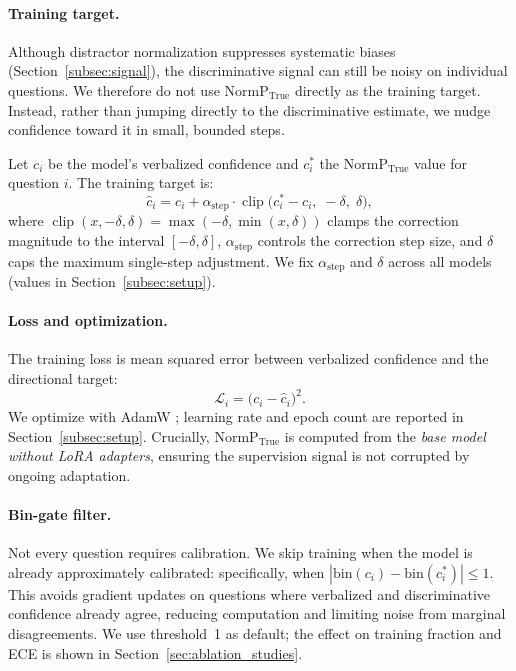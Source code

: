 \documentclass[11pt]{article}
\begin{document}
\paragraph{Training target.}
Although distractor normalization suppresses systematic biases (Section~\ref{subsec:signal}), the discriminative signal can still be noisy on individual questions. We therefore do not use $\text{NormP}_{\text{True}}$ directly as the training target. Instead, rather than jumping directly to the discriminative estimate, we nudge confidence toward it in small, bounded steps.

Let $c_i$ be the model's verbalized confidence and $c_i^*$ the $\text{NormP}_{\text{True}}$ value for question $i$.
The training target is:
\begin{equation} \label{eq:target}
    \hat{c}_i = c_i + \alpha_{\text{step}} \cdot \operatorname{clip}\!\big(c_i^* - c_i, \; {-}\delta, \; \delta\big),
\end{equation}
%
where $\operatorname{clip}(x, -\delta, \delta) = \max(-\delta, \min(x, \delta))$ clamps the correction magnitude to the interval $[-\delta, \delta]$, $\alpha_{\text{step}}$ controls the correction step size, and $\delta$ caps the maximum single-step adjustment.
We fix $\alpha_{\text{step}}$ and $\delta$ across all models (values in Section~\ref{subsec:setup}).

\paragraph{Loss and optimization.}
The training loss is mean squared error between verbalized confidence and the directional target:
\begin{equation} \label{eq:loss}
    \mathcal{L}_i = \big(c_i - \hat{c}_i\big)^2.
\end{equation}
We optimize with AdamW \cite{loshchilov_decoupled_2019}; learning rate and epoch count are reported in Section~\ref{subsec:setup}.
Crucially, $\text{NormP}_{\text{True}}$ is  computed from the \emph{base model without LoRA adapters}, ensuring the supervision signal is not corrupted by ongoing adaptation.

\paragraph{Bin-gate filter.}
Not every question requires calibration.
We skip training when the model is already approximately calibrated: specifically, when $|\text{bin}(c_i) - \text{bin}(c_i^*)| \leq 1$.
This avoids gradient updates on questions where verbalized and discriminative confidence already agree, reducing computation and limiting noise from marginal disagreements.
We use threshold~1 as default; the effect on training fraction and ECE is shown in Section~\ref{sec:ablation_studies}.
\end{document}
